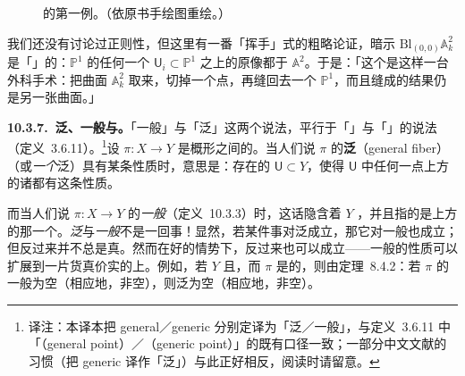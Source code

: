 \begin{figure}[htbp]
\centering
{}
\caption{\trBlowup{}的第一例。（依原书手绘图重绘。）}\label{fig:blowup-first-example}
\end{figure}

我们还没有讨论过正则性，但这里有一番「挥手」式的粗略论证，暗示 $\mathrm{Bl}_{(0,0)}\mathbb{A}^2_k$ 是「\trSmooth」的：$\mathbb{P}^1$ 的任何一个\trStandardOpenSet{} $\mathsf{U}_i\subset\mathbb{P}^1$ 之上的原像都\trIsomorphic{}于 $\mathbb{A}^2$。于是：「这个\trBlowup{}是这样一台外科手术：把\trSmooth{}曲面 $\mathbb{A}^2_k$ 取来，切掉一个点，再缝回去一个 $\mathbb{P}^1$，而且缝成的结果仍是另一张\trSmooth{}曲面。」

\textbf{10.3.7.\ 泛\trFiber、一般\trFiber{}与\trGenericallyFinite{}\trMorphism。}\quad 「一般\trFiber」与「泛\trFiber」这两个说法，平行于「\trGenericPoint」与「\trGeneralPoint」的说法（定义~3.6.11）。\footnote{译注：本译本把 general／generic 分别定译为「泛／一般」，与定义~3.6.11 中「\trGeneralPoint（general point）／\trGenericPoint（generic point）」的既有口径一致；一部分中文文献的习惯（把 generic 译作「泛」）与此正好相反，阅读时请留意。}设 $\pi\colon X\to Y$ 是概形之间的\trMorphism。当人们说 $\pi$ 的\textbf{泛\trFiber}（general fiber）（或\emph{一个}泛\trFiber）具有某条性质时，意思是：存在\trDense{}的\trOpenSubset{} $\mathsf{U}\subset Y$，使得 $\mathsf{U}$ 中任何一点上方的诸\trFiber{}都有这条性质。

而当人们说 $\pi\colon X\to Y$ 的\emph{一般\trFiber}（定义~10.3.3）时，这话隐含着 $Y$ \trIrreducible，并且指的是\trGenericPoint{}上方的那一个\trFiber。\emph{泛\trFiber}与\emph{一般\trFiber}不是一回事！显然，若某件事对泛\trFiber{}成立，那它对一般\trFiber{}也成立；但反过来并不总是真。然而在好的情势下，反过来也可以成立——一般\trFiber{}的性质可以扩展到一片货真价实的\trOpen\trNeighborhood{}上。例如，若 $Y$ \trIrreducible{}且\trNoetherian，而 $\pi$ 是\trFiniteType{}的，则由\trChevalley{}定理~8.4.2：若 $\pi$ 的一般\trFiber{}为空（相应地，非空），则泛\trFiber{}为空（相应地，非空）。

